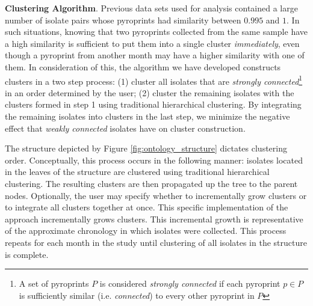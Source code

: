 \documentclass[12pt]{ucthesis}
\begin{document}
      \textbf{Clustering Algorithm}. Previous data sets used for analysis contained a
      large number of isolate pairs whose pyroprints had similarity between $0.995$
      and $1$. In such situations, knowing that two pyroprints collected from the
      same sample have a high similarity is sufficient to put them into a single
      cluster \textit{immediately}, even though a pyroprint from another month may
      have a higher similarity with one of them. In consideration of this, the
      algorithm we have developed constructs clusters in a two step process: (1)
      cluster all isolates that are \textit{strongly connected}\footnote{A set of
      pyroprints $P$ is considered \textit{strongly connected} if each pyroprint $p
      \in P$ is sufficiently similar (i.e. \textit{connected}) to every other
      pyroprint in $P$} in an order determined by the user; (2) cluster the remaining
      isolates with the clusters formed in step 1 using traditional hierarchical
      clustering. By integrating the remaining isolates into clusters in the last
      step, we minimize the negative effect that \textit{weakly connected} isolates
      have on cluster construction.

      The structure depicted by Figure \ref{fig:ontology_structure} dictates
      clustering order. Conceptually, this process occurs in the following manner:
      isolates located in the leaves of the structure are clustered using traditional
      hierarchical clustering. The resulting clusters are then propagated up the tree
      to the parent nodes. Optionally, the user may specify whether to incrementally
      grow clusters or to integrate all clusters together at once. This specific
      implementation of the approach incrementally grows clusters. This
      incremental growth is representative of the approximate chronology in which
      isolates were collected. This process repeats%
      for each month in the study until clustering of all isolates in the structure
      is complete.
\end{document}
